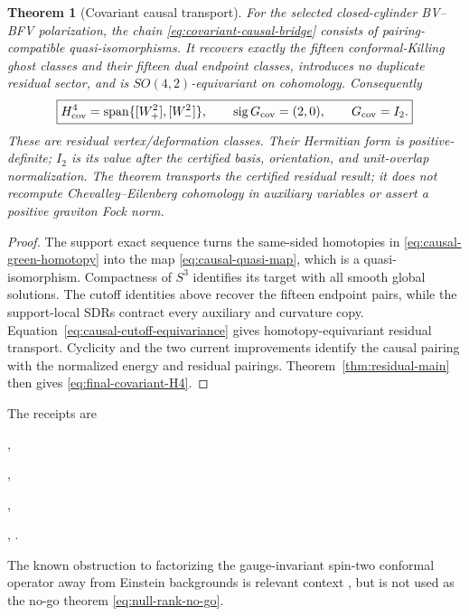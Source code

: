 \documentclass[11pt]{article}
\newtheorem{theorem}{Theorem}[section]
\theoremstyle{definition}
\theoremstyle{remark}
\begin{document}
\begin{theorem}[Covariant causal transport]\label{thm:covariant-causal-H4}
For the selected closed-cylinder BV--BFV polarization, the chain
\eqref{eq:covariant-causal-bridge} consists of pairing-compatible
quasi-isomorphisms.  It recovers exactly the fifteen conformal-Killing ghost
classes and their fifteen dual endpoint classes, introduces no duplicate
residual sector, and is $SO(4,2)$-equivariant on cohomology.  Consequently
\begin{equation}\label{eq:final-covariant-H4}
 \boxed{
 H^4_{\rm cov}
 =\operatorname{span}\{[W_+^2],[W_-^2]\},
 \qquad \operatorname{sig}G_{\rm cov}=(2,0),
 \qquad G_{\rm cov}=I_2.}
\end{equation}
These are residual vertex/deformation classes.  Their Hermitian form is
positive-definite; $I_2$ is its value after the certified basis,
orientation, and unit-overlap normalization.  The theorem transports the
certified residual result; it does not recompute Chevalley--Eilenberg
cohomology in auxiliary variables or assert a positive graviton Fock norm.
\end{theorem}

\begin{proof}
The support exact sequence turns the same-sided homotopies in
\eqref{eq:causal-green-homotopy} into the map
\eqref{eq:causal-quasi-map}, which is a quasi-isomorphism.  Compactness of
$S^3$ identifies its target with
all smooth global solutions.  The cutoff identities above recover the
fifteen endpoint pairs, while the support-local SDRs contract every auxiliary
and curvature copy.  Equation~\eqref{eq:causal-cutoff-equivariance} gives
homotopy-equivariant residual transport.  Cyclicity and the two current
improvements identify the causal pairing with the normalized energy and
residual pairings.  Theorem~\ref{thm:residual-main} then gives
\eqref{eq:final-covariant-H4}.
\end{proof}

The receipts are
\begin{center}\footnotesize
{},\par
{},\par
{},\par
{},\quad
{}.
\end{center}
The known
obstruction to factorizing the gauge-invariant spin-two conformal operator
away from Einstein backgrounds is relevant context \cite{NutmaTaronna}, but
is not used as the no-go theorem \eqref{eq:null-rank-no-go}.
\end{document}
